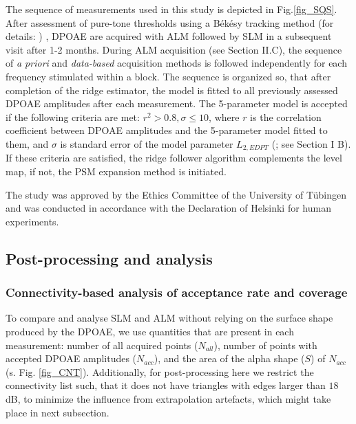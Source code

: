 \documentclass[journal,twoside,web]{ieeecolor2}
\begin{document}
The sequence of measurements used in this study is depicted in Fig.\ref{fig_SQS}.
After assessment of pure-tone thresholds using a Békésy tracking method (for details: \cite{Br2021}) , DPOAE are acquired with ALM followed by SLM in a subsequent visit after 1-2 months.
During ALM acquisition (see Section II.C), the sequence of \textit{a priori} and \textit{data-based} acquisition methods is followed independently for each frequency stimulated within a block.
The sequence is organized so, that after completion of the ridge estimator, the model is fitted to all previously assessed DPOAE amplitudes after each measurement.
The 5-parameter model is accepted if the following criteria are met: $r^2 > 0.8, \sigma \le 10$, where $r$ is the correlation coefficient between DPOAE amplitudes and the 5-parameter model fitted to them, and $\sigma $ is standard error of the model parameter $L_{2, EDPT}$ (\cite{ZD2020}; see Section I B).
If these criteria are satisfied, the ridge follower algorithm complements the level map, if not, the PSM expansion method is initiated.


The study was approved by the Ethics Committee of the University of Tübingen and   was conducted in accordance with the Declaration of Helsinki for human experiments.

\subsection{Post-processing and analysis}
\label{sec2_pproc}

\subsubsection{Connectivity-based analysis of acceptance rate and coverage}
To compare and analyse SLM and ALM without relying on the surface shape produced by the DPOAE, we use quantities that are present in each measurement: number of all acquired points ($N_{all}$), number of points with accepted DPOAE amplitudes ($N_{acc}$), and the area of the alpha shape ($S$) of $N_{acc}$ (s. Fig. \ref{fig_CNT}).
Additionally, for post-processing here we restrict the connectivity list such, that it does not have triangles with edges larger than $18$ dB, to minimize the influence from extrapolation artefacts, which might take place in next subsection.
\end{document}
